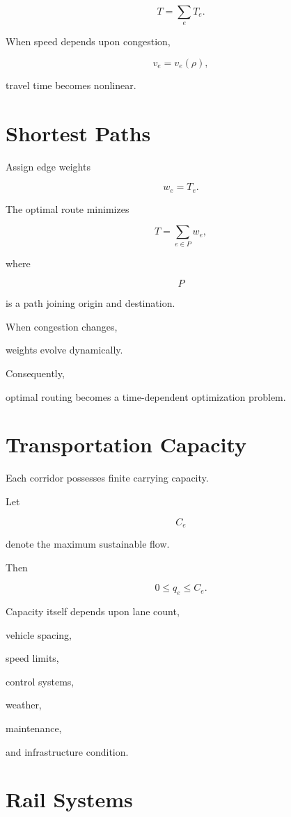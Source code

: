 \documentclass[11pt,fleqn]{book}
\numberwithin{equation}{chapter}
\theoremstyle{plain}
\theoremstyle{definition}
\theoremstyle{remark}
\begin{document}
\[
T
=
\sum_e
T_e.
\]

When speed depends upon congestion,

\[
v_e=v_e(\rho),
\]

travel time becomes nonlinear.


\section{Shortest Paths}

Assign edge weights

\[
w_e=T_e.
\]

The optimal route minimizes

\[
\boxed{
T
=
\sum_{e\in P}
w_e,
}
\]

where

\[
P
\]

is a path joining origin and destination.

When congestion changes,

weights evolve dynamically.

Consequently,

optimal routing becomes a time-dependent optimization problem.


\section{Transportation Capacity}

Each corridor possesses finite carrying capacity.

Let

\[
C_e
\]

denote the maximum sustainable flow.

Then

\[
0
\le
q_e
\le
C_e.
\]

Capacity itself depends upon lane count,

vehicle spacing,

speed limits,

control systems,

weather,

maintenance,

and infrastructure condition.


\section{Rail Systems}
\end{document}
